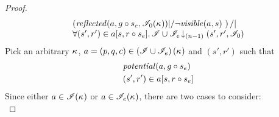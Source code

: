 \begin{lemma}
\begin{proof}
\begin{align*}
	& \quad
  \begin{array}{@{} l @{}}
		\left(\m{reflected}(a,g \composeL s_e, \lmod_0(\ca{})) |/ \neg\m{visible}(a, s) \ \right) /| \\
		\for{(s', r') \in a[s, r \composeL s_e]} \extendsAMUpto{\lmod \cup \lmod_e}{(n-1)}{s'}{r'}{\lmod_0}
 	\end{array} 
\end{align*}
%
%
Pick an arbitrary $\kappa_{}$, $a = (p, q, c) \in \left(\mathscr{I} \cup \mathscr{I}_e \right)(\kappa_{})$ and $(s', r')$ such that
%
\begin{align}
	& \mathit{potential}(a, g \circ s_e) \label{LEC2:Ass5}\\
	& (s', r') \in a[s, r \circ s_e] \label{LEC2:Ass6}
\end{align}
Since either $a \in \mathscr{I}(\kappa_{})$ or $a \in \mathscr{I}_e(\kappa_{})$, there are two cases to consider:\\


\end{proof}
\end{lemma}
